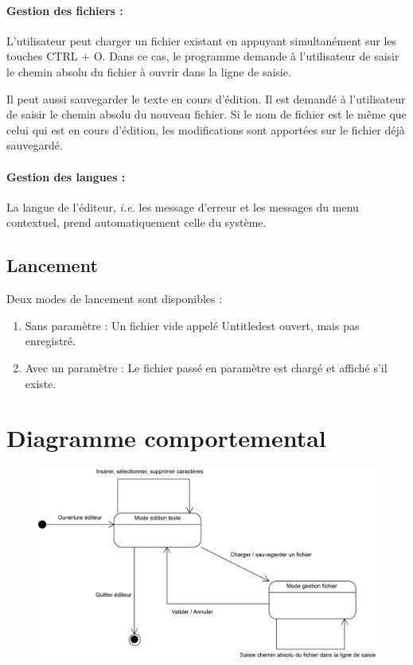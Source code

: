 \paragraph{Gestion des fichiers :}
L'utilisateur peut charger un fichier existant en appuyant simultanément sur les touches \og CTRL + O\fg. Dans ce cas, le programme demande à l'utilisateur de saisir le chemin absolu du fichier à ouvrir dans la ligne de saisie.

Il peut aussi sauvegarder le texte en cours d'édition. Il est demandé à
l'utilisateur de saisir le chemin absolu du nouveau fichier. Si le nom de
fichier est le même que celui qui est en cours d'édition, les modifications
sont apportées sur le fichier déjà sauvegardé.

\paragraph{Gestion des langues :}
La langue de l'éditeur, \textsl{i.e.} les message d'erreur et les messages du menu contextuel, prend automatiquement celle du système.

\subsection{Lancement}
Deux modes de lancement sont disponibles :
\begin{enumerate}
	\item Sans paramètre : Un fichier vide appelé \og Untitled\fg est ouvert, mais pas enregistré.
	\item Avec un paramètre : Le fichier passé en paramètre est chargé et affiché s'il existe.
\end{enumerate}

\section{Diagramme comportemental}
\begin{figure}[H]
\begin{center}
    \includegraphics[width=13cm]{img/EtatsEditeur}
	\vspace{-1cm}
\end{center}
\end{figure}


